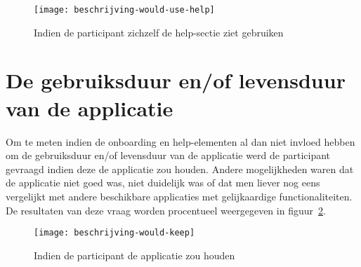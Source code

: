 \begin{figure}[h]
    \centering
    \texttt{[image: beschrijving-would-use-help]}
    \caption{Indien de participant zichzelf de help-sectie ziet gebruiken}
    \label{fig:beschrijving-would-use-help}
\end{figure}

\section{De gebruiksduur en/of levensduur van de applicatie}
\label{sec:gebruiksduur}

Om te meten indien de onboarding en help-elementen al dan niet invloed hebben om de gebruiksduur en/of levensduur van de applicatie werd de participant gevraagd indien deze de applicatie zou houden. Andere mogelijkheden waren dat de applicatie niet goed was, niet duidelijk was of dat men liever nog eens vergelijkt met andere beschikbare applicaties met gelijkaardige functionaliteiten. De resultaten van deze vraag worden procentueel weergegeven in figuur~\ref{fig:beschrijving-would-keep}.

\begin{figure}[h]
    \centering
    \texttt{[image: beschrijving-would-keep]}
    \caption{Indien de participant de applicatie zou houden}
    \label{fig:beschrijving-would-keep}
\end{figure}
